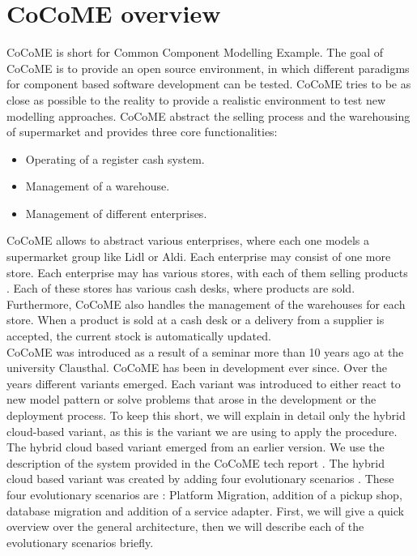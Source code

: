 \section{CoCoME overview}
\label{sec:cocome_overview}
CoCoME is short for Common Component Modelling Example. The goal of CoCoME is to provide an open source environment, in which different paradigms for component based software development can be tested. CoCoME tries to be as close as possible to the reality to provide a realistic environment to test new modelling approaches. %
CoCoME abstract the selling process and the warehousing of supermarket and provides three core functionalities:
\begin{itemize}
\item Operating of a register cash system.
\item Management of a warehouse.
\item Management of different enterprises.
\end{itemize}
CoCoME allows to abstract various enterprises, where each one models a supermarket group like Lidl or Aldi. Each enterprise may consist of one more store. Each enterprise may has various stores, with each of them selling products . Each of these stores has various cash desks, where products are sold. Furthermore, CoCoME also handles the management of the warehouses for each store. When a product is sold at a cash desk or a delivery from a supplier is accepted, the current stock is automatically updated. \\ CoCoME was introduced as a result of a seminar more than 10 years ago at the university Clausthal. CoCoME has been in development ever since. Over the years different variants emerged. Each variant was introduced to either react to new model pattern or solve problems that arose in the development or the deployment process. To keep this short, we will explain in detail only the hybrid cloud-based variant, as this is the variant we are using to apply the procedure. \\
The hybrid cloud based variant emerged from an earlier version. We use the description of the system provided in the CoCoME tech report \cite{CoCoMETechReport}. The hybrid cloud based variant was created by adding four evolutionary scenarios . These four evolutionary scenarios are : Platform Migration, addition of a pickup shop, database migration and addition of a service adapter. First, we will give a quick overview over the general architecture, then we will describe each of the evolutionary scenarios briefly.\\
